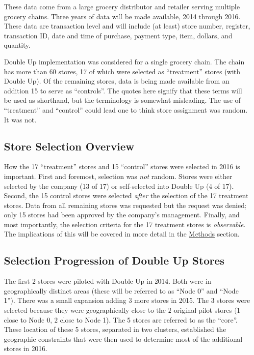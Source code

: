 \documentclass[11pt,letterpaperpaper,]{book}
\begin{document}
These data come from a large grocery distributor and retailer serving
multiple grocery chains. Three years of data will be made available,
2014 through 2016. These data are transaction level and will include (at
least) store number, register, transaction ID, date and time of
purchase, payment type, item, dollars, and quantity.

Double Up implementation was considered for a single grocery chain. The
chain has more than 60 stores, 17 of which were selected as
``treatment'' stores (with Double Up). Of the remaining stores, data is
being made available from an addition 15 to serve as ``controls''. The
quotes here signify that these terms will be used as shorthand, but the
terminology is somewhat misleading. The use of ``treatment'' and
``control'' could lead one to think store assignment was random. It was
not.

\subsection*{Store Selection Overview}\label{store-selection-overview}

How the 17 ``treatment'' stores and 15 ``control'' stores were selected
in 2016 is important. First and foremost, selection was \emph{not}
random. Stores were either selected by the company (13 of 17) or
self-selected into Double Up (4 of 17). Second, the 15 control stores
were selected \emph{after} the selection of the 17 treatment stores.
Data from all remaining stores was requested but the request was denied;
only 15 stores had been approved by the company's management. Finally,
and most importantly, the selection criteria for the 17 treatment stores
is \emph{observable}. The implications of this will be covered in more
detail in the \protect\hyperlink{methods}{Methods} section.

\subsection*{Selection Progression of Double Up
Stores}\label{selection-progression-of-double-up-stores}

The first 2 stores were piloted with Double Up in 2014. Both were in
geographically distinct areas (these will be referred to as ``Node 0''
and ``Node 1''). There was a small expansion adding 3 more stores in
2015. The 3 stores were selected because they were geographically close
to the 2 original pilot stores (1 close to Node 0, 2 close to Node 1).
The 5 stores are referred to as the ``core''. These location of these 5
stores, separated in two clusters, established the geographic
constraints that were then used to determine most of the additional
stores in 2016.
\end{document}
